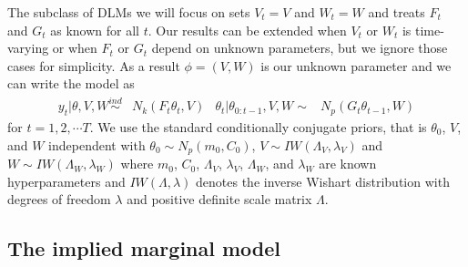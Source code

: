 \documentclass[12pt]{article}
\begin{document}
The subclass of DLMs we will focus on sets $V_t=V$ and $W_t=W$ and treats $F_{t}$ and $G_{t}$ as known for all $t$. Our results can be extended when $V_t$ or $W_t$ is time-varying or when $F_t$ or $G_t$ depend on unknown parameters, but we ignore those cases for simplicity. As a result $\phi=(V,W)$ is our unknown parameter and we can write the model as
\begin{align}
  y_t|\theta,V,W \stackrel{ind}{\sim} & N_k(F_t\theta_t,V) &
  \theta_t|\theta_{0:t-1},V,W  \sim & N_p(G_t\theta_{t-1},W) \label{dlmbotheqs}
\end{align}
for $t=1,2,\cdots T$. We use the standard conditionally conjugate priors, that is $\theta_0$, $V$, and $W$ independent with $\theta_0 \sim N_p(m_0, C_0)$, $V \sim IW(\Lambda_V, \lambda_V)$ and $W \sim IW(\Lambda_W, \lambda_W)$ where $m_0$, $C_0$, $\Lambda_V$, $\lambda_V$, $\Lambda_W$, and $\lambda_W$ are known hyperparameters and $IW(\Lambda, \lambda)$ denotes the inverse Wishart distribution with degrees of freedom $\lambda$ and positive definite scale matrix $\Lambda$.

\subsection{The implied marginal model}\label{sec:DLM:marg}
\end{document}
